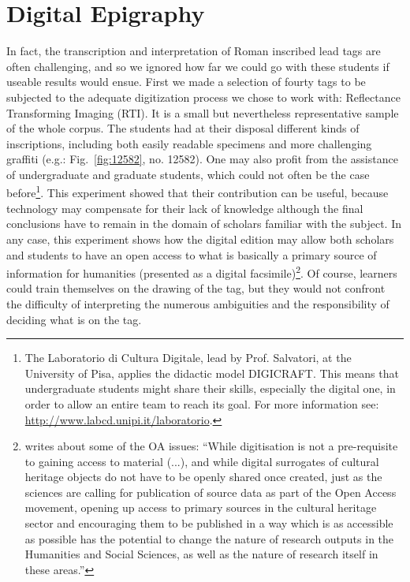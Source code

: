 \documentclass[amsthm,ebook]{saparticle}
\begin{document}
\section{Digital Epigraphy}


In fact, the transcription and interpretation of Roman inscribed lead tags are often challenging, and so we ignored how
far we could go with these students if useable results would ensue. First we made a selection of fourty tags to be
subjected to the adequate digitization process we chose to work with: Reflectance Transforming Imaging (RTI). It is a
small but nevertheless representative sample of the whole corpus. The students had at their disposal different kinds of
inscriptions, including both easily readable specimens and more challenging graffiti (e.g.: Fig.~\ref{fig:12582}, no. 12582). One may also
profit from the assistance of undergraduate and graduate students, which could not often be the case
before\footnote{The Laboratorio di Cultura Digitale, lead by Prof. Salvatori, at the University of Pisa, applies the
didactic model DIGICRAFT. This means that undergraduate students might share their skills, especially the digital one,
in order to allow an entire team to reach its goal. For more information see: \url{http://www.labcd.unipi.it/laboratorio}.}.
This experiment showed that their contribution can be useful, because technology may compensate for their lack of
knowledge although the final conclusions have to remain in the domain of scholars familiar with the subject. In any
case, this experiment shows how the digital edition may allow both scholars and students to have an open access to what
is basically a primary source of information for humanities (presented as a digital facsimile)\footnote{\citet{gorman_opening_2015}
writes about some of the OA issues: ``While digitisation is not a pre-requisite to gaining access to material (...), and
while digital surrogates of cultural heritage objects do not have to be openly shared once created, just as the
sciences are calling for publication of source data as part of the Open Access movement, opening up access to primary
sources in the cultural heritage sector and encouraging them to be published in a way which is as accessible as
possible has the potential to change the nature of research outputs in the Humanities and Social Sciences, as well as
the nature of research itself in these areas.''}. Of course, learners could train themselves on the drawing of the tag,
but they would not confront the difficulty of interpreting the numerous ambiguities and the responsibility of deciding
what is on the tag. 
\end{document}
